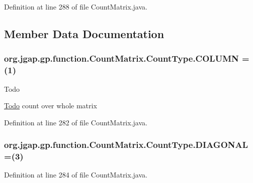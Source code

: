 Definition at line 288 of file Count\-Matrix.\-java.



\subsection{Member Data Documentation}
\hypertarget{enumorg_1_1jgap_1_1gp_1_1function_1_1_count_matrix_1_1_count_type_a7ab04ee65255adb71c8f6a47b727b775}{
\subsubsection[{C\-O\-L\-U\-M\-N}]{\setlength{\rightskip}{0pt plus 5cm}org.\-jgap.\-gp.\-function.\-Count\-Matrix.\-Count\-Type.\-C\-O\-L\-U\-M\-N =(1)}}\label{enumorg_1_1jgap_1_1gp_1_1function_1_1_count_matrix_1_1_count_type_a7ab04ee65255adb71c8f6a47b727b775}
\begin{DoxyRefDesc}{Todo}
\item[\hyperlink{todo__todo000124}{Todo}]count over whole matrix \end{DoxyRefDesc}


Definition at line 282 of file Count\-Matrix.\-java.

\hypertarget{enumorg_1_1jgap_1_1gp_1_1function_1_1_count_matrix_1_1_count_type_a2d241774e0b56e6c7a7be79cecc7d1ba}{
\subsubsection[{D\-I\-A\-G\-O\-N\-A\-L}]{\setlength{\rightskip}{0pt plus 5cm}org.\-jgap.\-gp.\-function.\-Count\-Matrix.\-Count\-Type.\-D\-I\-A\-G\-O\-N\-A\-L =(3)}}\label{enumorg_1_1jgap_1_1gp_1_1function_1_1_count_matrix_1_1_count_type_a2d241774e0b56e6c7a7be79cecc7d1ba}


Definition at line 284 of file Count\-Matrix.\-java.

